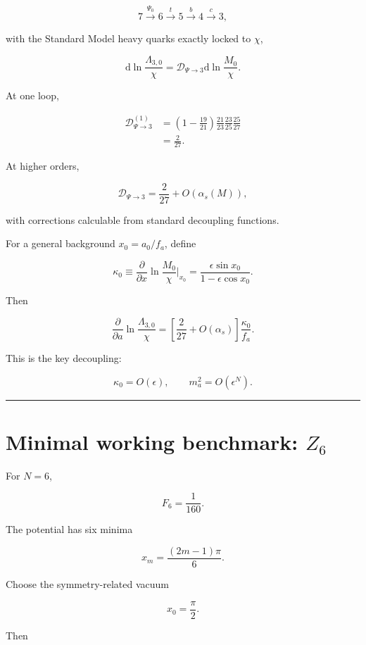 \documentclass[11pt,a4paper]{article}
\begin{document}
\[
7\xrightarrow{\Psi_0}6\xrightarrow{t}5\xrightarrow{b}4\xrightarrow{c}3,
\]

with the Standard Model heavy quarks exactly locked to \(\chi\),

\[
\mathrm d\ln\frac{\Lambda_{3,0}}{\chi}
=\mathcal D_{\Psi\to3}
\mathrm d\ln\frac{M_0}{\chi}.
\]

At one loop,

\[
\begin{aligned}
\mathcal D_{\Psi\to3}^{(1)}
&=
\left(1-\frac{19}{21}\right)
\frac{21}{23}\frac{23}{25}\frac{25}{27}
\\
&=\boxed{\frac{2}{27}}.
\end{aligned}
\]

At higher orders,

\[
\mathcal D_{\Psi\to3}
=\frac{2}{27}+O(\alpha_s(M)),
\]

with corrections calculable from standard decoupling functions.

For a general background \(x_0=a_0/f_a\), define

\[
\kappa_0
\equiv
\frac{\partial}{\partial x}
\ln\frac{M_0}{\chi}
\bigg|_{x_0}
=
\frac{\epsilon\sin x_0}{1-\epsilon\cos x_0}.
\]

Then

\[
\boxed{
\frac{\partial}{\partial a}
\ln\frac{\Lambda_{3,0}}{\chi}
=
\left[\frac{2}{27}+O(\alpha_s)\right]
\frac{\kappa_0}{f_a}.
}
\]

This is the key decoupling:

\[
\kappa_0=O(\epsilon),
\qquad
m_a^2=O(\epsilon^N).
\]

\begin{center}\rule{0.5\linewidth}{0.5pt}\end{center}

\section{\texorpdfstring{Minimal working benchmark:
\(Z_6\)}{Minimal working benchmark: Z\_6}}\label{minimal-working-benchmark-z_6}

For \(N=6\),

\[
F_6=\frac1{160}.
\]

The potential has six minima

\[
x_m=\frac{(2m-1)\pi}{6}.
\]

Choose the symmetry-related vacuum

\[
\boxed{x_0=\frac\pi2.}
\]

Then
\end{document}

